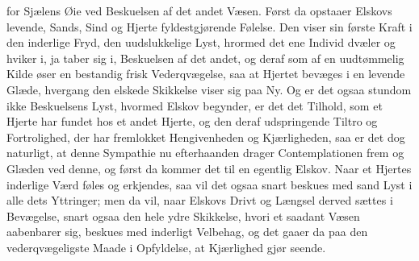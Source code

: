 \documentclass[12pt,a4paper]{book}
\newcommand{\apage}[1]{\marginnote{\footnotesize\textit{[#1]}}}
\begin{document}
for Sjælens Øie ved Beskuelsen af det andet Væsen. Først da opstaaer
Elskovs levende, Sands, Sind og Hjerte fyldestgjørende Følelse. Den
viser sin første Kraft i den inderlige Fryd, den \apage{6} uudslukkelige Lyst,
hrormed det ene Individ dvæler og hviker i, ja taber sig i, Beskuelsen
af det andet, og deraf som af en uudtømmelig Kilde øser en bestandig
frisk Vederqvægelse, saa at Hjertet bevæges i en levende Glæde,
hvergang den elskede Skikkelse viser sig paa Ny. Og er det ogsaa
stundom ikke Beskuelsens Lyst, hvormed Elskov begynder, er det det
Tilhold, som et Hjerte har fundet hos et andet Hjerte, og den deraf
udspringende Tiltro og Fortrolighed, der har fremlokket Hengivenheden
og Kjærligheden, saa er det dog naturligt, at denne Sympathie nu
efterhaanden drager Contemplationen frem og Glæden ved denne, og først
da kommer det til en egentlig Elskov. Naar et Hjertes inderlige Værd
føles og erkjendes, saa vil det ogsaa snart beskues med sand Lyst i
alle dets Yttringer; men da vil, naar Elskovs Drivt og Længsel derved
sættes i Bevægelse, snart ogsaa den hele ydre Skikkelse, hvori et
saadant Væsen aabenbarer sig, beskues med inderligt Velbehag, og det
gaaer da paa den vederqvægeligste Maade i Opfyldelse, at Kjærlighed
gjør seende.
\end{document}
